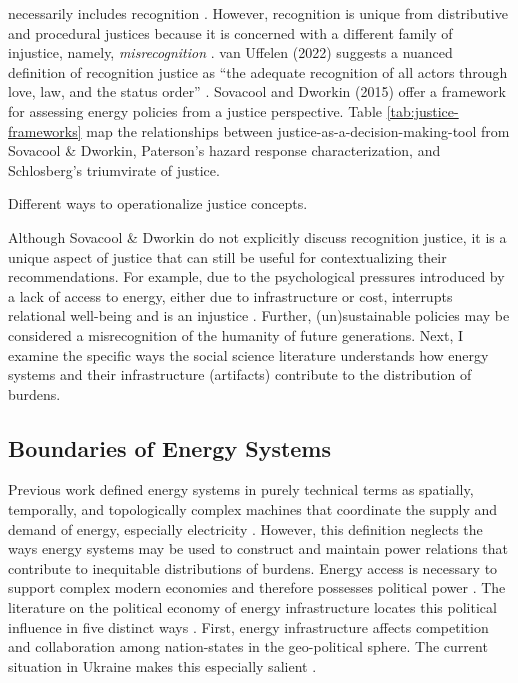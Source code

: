     necessarily includes recognition \cite{schlosberg_2_2007}. However,
    recognition is unique from distributive and procedural justices because it
    is concerned with a different family of injustice, namely,
    \textit{misrecognition} \cite{van_uffelen_revisiting_2022}. van Uffelen
    (2022) suggests a nuanced definition of recognition justice as ``the
    adequate recognition of all actors through love, law, and the status order''
    \cite{van_uffelen_revisiting_2022}.
Sovacool and Dworkin (2015) offer a framework for assessing energy policies from
a justice perspective. Table \ref{tab:justice-frameworks} map the relationships
between justice-as-a-decision-making-tool from Sovacool \& Dworkin, Paterson's
hazard response characterization, and Schlosberg's triumvirate of justice. 

\begin{table}[h]
    \centering
    \caption{Different ways to operationalize justice concepts.}
    
    \label{tab:justice-frameworks}
\end{table}

Although Sovacool \& Dworkin do not explicitly discuss recognition justice, it
is a unique aspect of justice that can still be useful for contextualizing their
recommendations. For example, due to the psychological pressures introduced by a
lack of access to energy, either due to infrastructure or cost, interrupts
relational well-being and is an injustice \cite{van_uffelen_revisiting_2022}.
Further, (un)sustainable policies may be considered a misrecognition of the
humanity of future generations. Next, I examine the specific ways the social
science literature understands how energy systems and their infrastructure
(artifacts) contribute to the distribution of burdens.

\subsection{Boundaries of Energy Systems}
\label{section:energy-system-boundaries}
Previous work defined energy systems in purely technical terms as spatially,
temporally, and topologically complex machines that coordinate the supply and
demand of energy, especially electricity \cite{dotson_influence_2022}. However,
this definition neglects the ways energy systems may be used to construct and
maintain power relations that contribute to inequitable distributions of
burdens. Energy access is necessary to support complex modern economies and
therefore possesses political power \cite{jones_building_2013,
bridge_energy_2018}. The literature on the political economy of energy
infrastructure locates this political influence in five distinct ways
\cite{bridge_energy_2018}. First, energy infrastructure affects competition and
collaboration among nation-states in the geo-political sphere. The current
situation in Ukraine makes this especially salient
\cite{figueiredo_impacts_2022}. 

